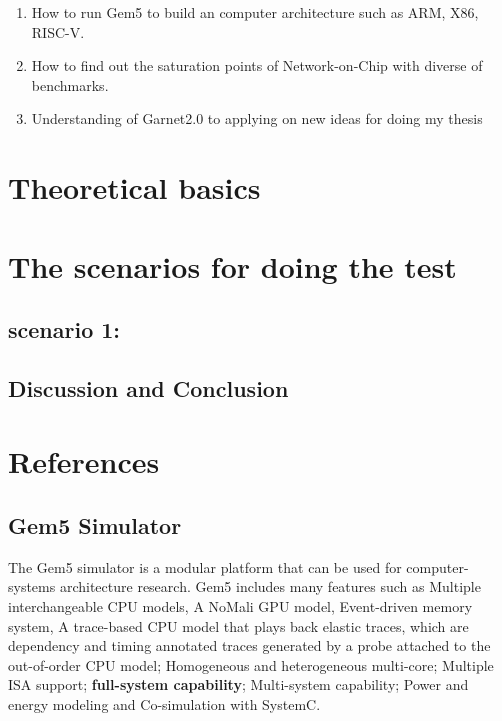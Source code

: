 \documentclass[13pt]{article}
\begin{document}
	\begin{enumerate}
		\item How to run Gem5 to build an computer architecture such as ARM, X86, RISC-V.
		\item How to find out the saturation points of Network-on-Chip with diverse of benchmarks.
		\item Understanding of Garnet2.0 to applying on new ideas for doing my thesis
	\end{enumerate}

\section{Theoretical basics}


\section{The scenarios for doing the test}

\subsection{scenario 1: }

\subsection{Discussion and Conclusion}

\section{References}


\subsection{Gem5 Simulator}
	The Gem5 simulator is a modular platform that can be used for computer-systems architecture research. Gem5 includes many features such as Multiple interchangeable CPU models, A NoMali GPU model, Event-driven memory system, A trace-based CPU model that plays back elastic traces, which are dependency and timing annotated traces generated by a probe attached to the out-of-order CPU model; Homogeneous and heterogeneous multi-core; Multiple ISA support; \textbf{full-system capability}; Multi-system capability; Power and energy modeling and Co-simulation with SystemC.
	
\end{document}
